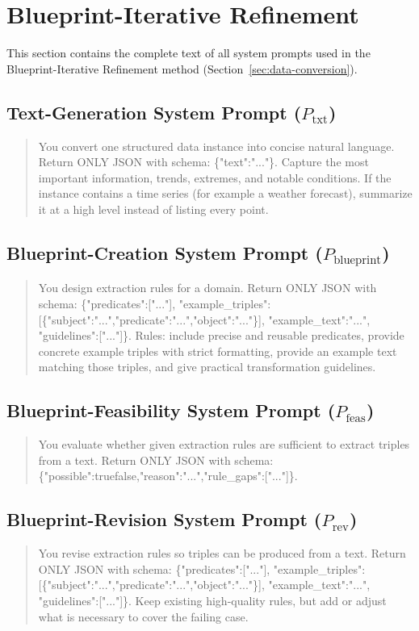 \section{Blueprint-Iterative Refinement}
\label{app:prompts-blueprint}

This section contains the complete text of all system prompts used in the Blueprint-Iterative Refinement method (Section~\ref{sec:data-conversion}).

\subsection*{Text-Generation System Prompt ($P_{\mathrm{txt}}$)}
\begin{quote}
You convert one structured data instance into concise natural language. Return ONLY JSON with schema: \{"text":"..."\}. Capture the most important information, trends, extremes, and notable conditions. If the instance contains a time series (for example a weather forecast), summarize it at a high level instead of listing every point.
\end{quote}

\subsection*{Blueprint-Creation System Prompt ($P_{\mathrm{blueprint}}$)}
\begin{quote}
You design extraction rules for a domain. Return ONLY JSON with schema: \{"predicates":["..."], "example\_triples":[\{"subject":"...","predicate":"...","object":"..."\}], "example\_text":"...", "guidelines":["..."]\}. Rules: include precise and reusable predicates, provide concrete example triples with strict formatting, provide an example text matching those triples, and give practical transformation guidelines.
\end{quote}

\subsection*{Blueprint-Feasibility System Prompt ($P_{\mathrm{feas}}$)}
\begin{quote}
You evaluate whether given extraction rules are sufficient to extract triples from a text. Return ONLY JSON with schema: \{"possible":true\textbar false,"reason":"...","rule\_gaps":["..."]\}.
\end{quote}

\subsection*{Blueprint-Revision System Prompt ($P_{\mathrm{rev}}$)}
\begin{quote}
You revise extraction rules so triples can be produced from a text. Return ONLY JSON with schema: \{"predicates":["..."], "example\_triples":[\{"subject":"...","predicate":"...","object":"..."\}], "example\_text":"...", "guidelines":["..."]\}. Keep existing high-quality rules, but add or adjust what is necessary to cover the failing case.
\end{quote}

